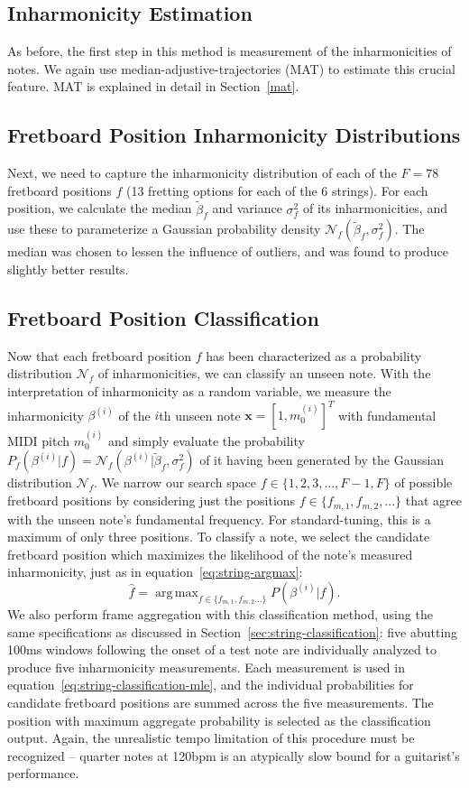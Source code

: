 \documentclass[12pt]{cmuthesis}
\DeclareMathOperator*{\argmax}{arg\,max}
\begin{document}
\subsection{Inharmonicity Estimation}
As before, the first step in this method is measurement of the inharmonicities of notes. We again use median-adjustive-trajectories (MAT) to estimate this crucial feature. MAT is explained in detail in Section~\ref{mat}.

\subsection{Fretboard Position Inharmonicity Distributions}
Next, we need to capture the inharmonicity distribution of each of the $F = 78$ fretboard positions $f$ (13 fretting options for each of the 6 strings). For each position, we calculate the median $\tilde{\beta}_f$ and variance $\sigma^2_f$ of its inharmonicities, and use these to parameterize a Gaussian probability density $\mathcal{N}_f(\tilde{\beta}_f,\sigma^2_f)$. The median was chosen to lessen the influence of outliers, and was found to produce slightly better results.

\subsection{Fretboard Position Classification}
Now that each fretboard position $f$ has been characterized as a probability distribution $\mathcal{N}_f$ of inharmonicities, we can classify an unseen note. With the interpretation of inharmonicity as a random variable, we measure the inharmonicity $\beta^{(i)}$ of the $i$th unseen note $\mathbf{x}=[1,m_0^{(i)}]^T$ with fundamental MIDI pitch $m_0^{(i)}$ and simply evaluate the probability $P_f(\beta^{(i)} | f) = \mathcal{N}_f(\beta^{(i)} | \tilde{\beta}_f,\sigma^2_f)$ of it having been generated by the Gaussian distribution $\mathcal{N}_f$. We narrow our search space $f \in \{1,2,3,...,F-1,F\}$ of possible fretboard positions by considering just the positions $f \in \{f_{m,1},f_{m,2},...\}$ that agree with the unseen note's fundamental frequency. For standard-tuning, this is a maximum of only three positions. To classify a note, we select the candidate fretboard position which maximizes the likelihood of the note's measured inharmonicity, just as in equation~\eqref{eq:string-argmax}:
\begin{equation}
\hat{f} = \argmax_{f\in\{f_{m,1},f_{m,2}...\}}P(\beta^{(i)} | f).
\label{eq:string-classification-mle}
\end{equation}
We also perform frame aggregation with this classification method, using the same specifications as discussed in Section~\ref{sec:string-classification}: five abutting 100ms windows following the onset of a test note are individually analyzed to produce five inharmonicity measurements. Each measurement is used in equation~\eqref{eq:string-classification-mle}, and the individual probabilities for candidate fretboard positions are summed across the five measurements. The position with maximum aggregate probability is selected as the classification output. Again, the unrealistic tempo limitation of this procedure must be recognized -- quarter notes at 120bpm is an atypically slow bound for a guitarist's performance.
\end{document}
